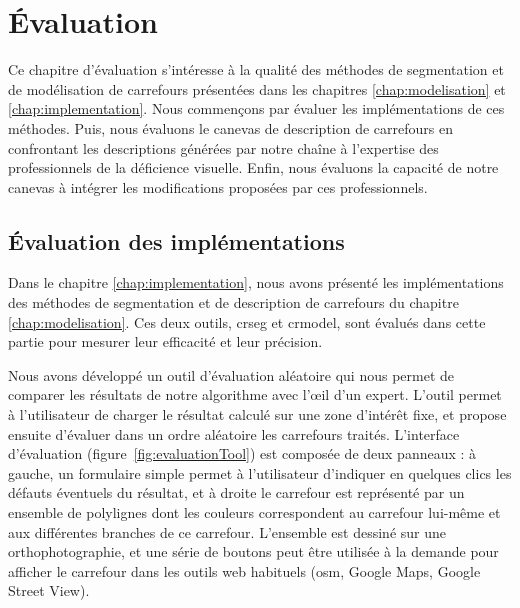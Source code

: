 \chapter{Évaluation}
\label{chap:evaluation}

Ce chapitre d'évaluation s'intéresse à la qualité des méthodes de segmentation et de modélisation de carrefours présentées dans les chapitres \ref{chap:modelisation} et \ref{chap:implementation}. Nous commençons par évaluer les implémentations de ces méthodes. Puis, nous évaluons le canevas de description de carrefours en confrontant les descriptions générées par notre chaîne à l'expertise des professionnels de la déficience visuelle. Enfin, nous évaluons la capacité de notre canevas à intégrer les modifications proposées par ces professionnels.

\section{Évaluation des implémentations}

\label{sec:evaluation_implementation}

Dans le chapitre \ref{chap:implementation}, nous avons présenté les implémentations des méthodes de segmentation et de description de carrefours du chapitre \ref{chap:modelisation}. Ces deux outils, crseg et crmodel, sont évalués dans cette partie pour mesurer leur efficacité et leur précision.

\newpar{}

Nous avons développé un outil d'évaluation aléatoire qui nous permet de comparer les résultats de notre algorithme avec l'œil d'un expert. L'outil permet à l'utilisateur de charger le résultat calculé sur une zone d'intérêt fixe, et propose ensuite d'évaluer dans un ordre aléatoire les carrefours traités. L'interface d'évaluation (figure~\ref{fig:evaluationTool}) est composée de deux panneaux : à gauche, un formulaire simple permet à l'utilisateur d'indiquer en quelques clics les défauts éventuels du résultat, et à droite le carrefour est représenté par un ensemble de polylignes dont les couleurs correspondent au carrefour lui-même et aux différentes branches de ce carrefour. L'ensemble est dessiné sur une orthophotographie, et une série de boutons peut être utilisée à la demande pour afficher le carrefour dans les outils web habituels (\gls{osm}, Google Maps, Google Street View).

